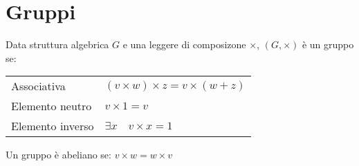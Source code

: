 \section{Gruppi}
Data struttura algebrica $G$ e una leggere di composizone $\times$, $(G, \times)$ è un gruppo se: \\
\begin{tabular}{ll}
	Associativa & $(v \times w) \times z = v \times (w + z)$ \\
	Elemento neutro & $v \times 1 = v$ \\
	Elemento inverso & $\exists x \quad v \times x = 1$
\end{tabular}

Un gruppo è abeliano se: $v \times w = w \times v$ \\